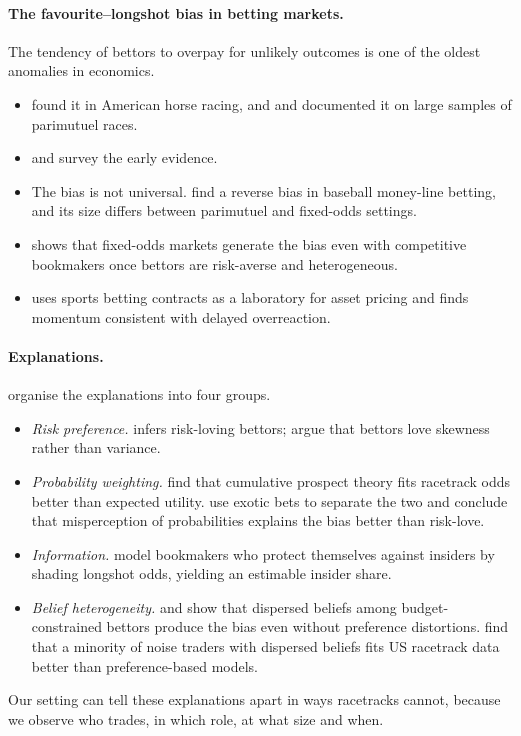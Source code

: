 \paragraph{The favourite--longshot bias in betting markets.} The tendency of bettors to overpay for
unlikely outcomes is one of the oldest anomalies in economics.
\begin{itemize}
  \item \citet{griffith1949} found it in American horse racing, and \citet{ali1977} and
  \citet{hausch1981} documented it on large samples of parimutuel races.
  \item \citet{thalerziemba1988} and \citet{sauer1998} survey the early evidence.
  \item The bias is not universal. \citet{woodland1994} find a reverse bias in baseball money-line
  betting, and its size differs between parimutuel and fixed-odds settings.
  \item \citet{whelan2024} shows that fixed-odds markets generate the bias even with competitive
  bookmakers once bettors are risk-averse and heterogeneous.
  \item \citet{moskowitz2021} uses sports betting contracts as a laboratory for asset pricing and
  finds momentum consistent with delayed overreaction.
\end{itemize}

\paragraph{Explanations.} \citet{ottaviani2008} organise the explanations into four groups.
\begin{itemize}
  \item \emph{Risk preference.} \citet{ali1977} infers risk-loving bettors; \citet{golec1998}
  argue that bettors love skewness rather than variance.
  \item \emph{Probability weighting.} \citet{jullien2000} find that cumulative prospect theory
  \citep{kahneman1979,tversky1992} fits racetrack odds better than expected utility.
  \citet{snowbergwolfers2010} use exotic bets to separate the two and conclude that misperception
  of probabilities explains the bias better than risk-love.
  \item \emph{Information.} \citet{shin1991,shin1993} model bookmakers who protect themselves
  against insiders by shading longshot odds, yielding an estimable insider share.
  \item \emph{Belief heterogeneity.} \citet{ali1977} and \citet{gandhi2015} show that dispersed
  beliefs among budget-constrained bettors produce the bias even without preference distortions.
  \citet{gandhi2015} find that a minority of noise traders with dispersed beliefs fits US
  racetrack data better than preference-based models.
\end{itemize}
Our setting can tell these explanations apart in ways racetracks cannot, because we observe who
trades, in which role, at what size and when.

